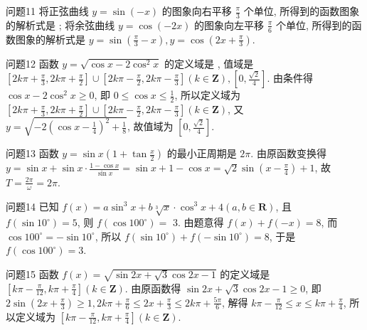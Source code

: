 问题11 将正弦曲线 $y=\sin (-x)$ 的图象向右平移 $\frac{\pi}{3}$ 个单位, 所得到的函数图象的解析式是 ; 将余弦曲线 $y=\cos (-2 x)$ 的图象向左平移 $\frac{\pi}{6}$ 个单位, 所得到的函数图象的解析式是
$y=\sin \left(\frac{\pi}{3}-x\right), y=\cos \left(2 x+\frac{\pi}{3}\right)$.



问题12 函数 $y=\sqrt{\cos x-2 \cos ^2 x}$ 的定义域是 , 值域是
$\left[2 k \pi+\frac{\pi}{3}, 2 k \pi+\frac{\pi}{2}\right] \cup\left[2 k \pi-\frac{\pi}{2}, 2 k \pi-\frac{\pi}{3}\right](k \in \mathbf{Z}),\left[0, \frac{\sqrt{2}}{4}\right]$.
由条件得 $\cos x-2 \cos ^2 x \geqslant 0$, 即 $0 \leqslant \cos x \leqslant \frac{1}{2}$, 所以定义域为 $\left[2 k \pi+\frac{\pi}{3}, 2 k \pi+\frac{\pi}{2}\right] \cup\left[2 k \pi-\frac{\pi}{2}, 2 k \pi-\frac{\pi}{3}\right](k \in \mathbf{Z})$, 又 $y=\sqrt{-2\left(\cos x-\frac{1}{4}\right)^2+\frac{1}{8}}$, 故值域为 $\left[0, \frac{\sqrt{2}}{4}\right]$.



问题13 函数 $y=\sin x\left(1+\tan \frac{x}{2}\right)$ 的最小正周期是
$2 \pi$. 由原函数变换得 $y=\sin x+\sin x \cdot \frac{1-\cos x}{\sin x}=\sin x+1- \cos x=\sqrt{2} \sin \left(x-\frac{\pi}{4}\right)+1$, 故 $T=\frac{2 \pi}{\omega}=2 \pi$.



问题14 已知 $f(x)=a \sin ^3 x+b \sqrt[3]{x} \cdot \cos ^3 x+4(a, b \in \mathbf{R})$, 且 $f\left(\sin 10^{\circ}\right)=5$, 则 $f\left(\cos 100^{\circ}\right)=$
3. 由题意得 $f(x)+f(-x)=8$, 而 $\cos 100^{\circ}=-\sin 10^{\circ}$, 所以 $f\left(\sin 10^{\circ}\right)+f\left(-\sin 10^{\circ}\right)=8$, 于是 $f\left(\cos 100^{\circ}\right)=3$.



问题15 函数 $f(x)=\sqrt{\sin 2 x+\sqrt{3} \cos 2 x-1}$ 的定义域是
$\left[k \pi-\frac{\pi}{12}, k \pi+\frac{\pi}{4}\right](k \in \mathbf{Z})$. 由原函数得 $\sin 2 x+\sqrt{3} \cos 2 x-1 \geqslant 0$, 即 $2 \sin \left(2 x+\frac{\pi}{3}\right) \geqslant 1,2 k \pi+\frac{\pi}{6} \leqslant 2 x+\frac{\pi}{3} \leqslant 2 k \pi+\frac{5 \pi}{6}$, 解得 $k \pi-\frac{\pi}{12} \leqslant x \leqslant k \pi+\frac{\pi}{4}$, 所以定义域为 $\left[k \pi-\frac{\pi}{12}, k \pi+\frac{\pi}{4}\right](k \in \mathbf{Z})$.



